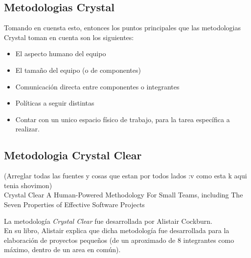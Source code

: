 \documentclass[12pt,a4paper]{article}
\begin{document}
	\subsection*{Metodologias Crystal}	
	Tomando en cuensta esto, entonces los puntos principales que las metodologias Crystal toman en cuenta son los siguientes:\\
	\begin{itemize}		
		\item El aspecto humano del equipo

		\item El tamaño del equipo (o de componentes)		
	
		\item Comunicación directa entre componentes o integrantes
		
		\item Políticas a seguir distintas
	
		\item Contar con un unico espacio físico de trabajo, para la tarea específica a realizar.
	\end{itemize}
	
	\subsection*{Metodologia Crystal Clear}
	(Arreglar todas las fuentes y cosas que estan por todos lados :v como esta k aqui tenia shovimon)\\
	Crystal Clear A Human-Powered Methodology For Small Teams, including The Seven Properties of Effective Software Projects \linebreak
		
	La metodolog\'ia \textit{Crystal Clear} fue desarrollada por Alistair Cockburn.\\
	En su libro, Alistair explica que dicha metodolog\'ia fue desarrollada para la elaboraci\'on de proyectos peque\~nos (de un aproximado de 8 integrantes como máximo, dentro de un area en com\'un). \\
	
\end{document}
